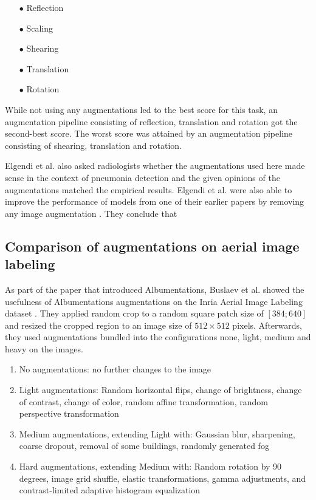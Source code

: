 \documentclass[10pt]{book}
\begin{document}
\begin{itemize}
  \item[$\bullet$] Reflection
  \item[$\bullet$] Scaling
  \item[$\bullet$] Shearing
  \item[$\bullet$] Translation
  \item[$\bullet$] Rotation
\end{itemize}

While not using any augmentations led to the best score for this task, an augmentation pipeline consisting of reflection, translation and rotation got the second-best score. The worst score was attained by an augmentation pipeline consisting of shearing, translation and rotation. 

Elgendi et al. also asked radiologists whether the augmentations used here made sense in the context of pneumonia detection and the given opinions of the augmentations matched the empirical results. Elgendi et al. were also able to improve the performance of models from one of their earlier papers
by removing any image augmentation \cite{elgendi2020performance, elgendi2021effectiveness}. They conclude that \cite[optimization over each geometric augmentation is needed. For example, defining an “acceptable” range of rotation.]{elgendi2021effectiveness}

\subsection{Comparison of augmentations on aerial image labeling}

As part of the paper that introduced Albumentations, Buslaev et al. showed the usefulness of Albumentations augmentations on the Inria Aerial Image Labeling dataset \cite{info11020125,maggiori2017can}. They applied random crop to a random square patch size of $[384;640]$ and resized the cropped region to an image size of $512 \times 512$ pixels. Afterwards, they used augmentations bundled into the configurations none, light, medium and heavy on the images.

\begin{enumerate}
  \item No augmentations: no further changes to the image
  \item Light augmentations: Random horizontal flips, change of brightness, change of contrast, change of color, random affine transformation, random perspective transformation
  \item Medium augmentations, extending Light with: Gaussian blur, sharpening, coarse dropout, removal of some buildings, randomly generated fog
  \item Hard augmentations, extending Medium with: Random rotation by 90 degrees, image grid shuffle, elastic transformations, gamma adjustments, and contrast-limited adaptive histogram equalization
\end{enumerate}
\end{document}
